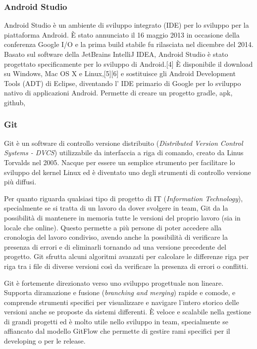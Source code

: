 \subsubsection{Android Studio}
Android Studio \autocite{WIKIPEDIA:ANDROIDSTUDIO} è un ambiente di sviluppo integrato (IDE) per lo sviluppo per la piattaforma Android. È stato annunciato il 16 maggio 2013 in occasione della conferenza Google I/O e la prima build stabile fu rilasciata nel dicembre del 2014.
Basato sul software della JetBrains IntelliJ IDEA, Android Studio è stato progettato specificamente per lo sviluppo di Android.[4] È disponibile il download su Windows, Mac OS X e Linux,[5][6] e sostituisce gli Android Development Tools (ADT) di Eclipse, diventando l' IDE primario di Google per lo sviluppo nativo di applicazioni Android.
Permette di creare un progetto gradle, apk, github, 


\subsubsection{Git}
Git è un software di controllo versione distribuito (\textit{Distributed Version Control Systems - DVCS}) utilizzabile da interfaccia a riga di comando, creato da Linus Torvalds nel 2005. \autocite{WIKIPEDIA:GIT}
Nacque per essere un semplice strumento per facilitare lo sviluppo del kernel Linux ed è diventato uno degli strumenti di controllo versione più diffusi.

Per quanto riguarda qualsiasi tipo di progetto di IT (\textit{Information Technology}), specialmente se si tratta di un lavoro da dover svolgere in team, Git da la possibilità di mantenere in memoria tutte le versioni del proprio lavoro (sia in locale che online).
Questo permette a più persone di poter accedere alla cronologia del lavoro condiviso, avendo anche la possibilità di verificare la presenza di errori e di eliminarli tornando ad una versione precedente del progetto.
Git sfrutta alcuni algoritmi avanzati per calcolare le differenze riga per riga tra i file di diverse versioni così da verificare la presenza di errori o conflitti.

Git è fortemente direzionato verso uno sviluppo progettuale non lineare. Supporta diramazione e fusione (\textit{branching and merging}) rapide e comode, e comprende strumenti specifici per visualizzare e navigare l'intero storico delle versioni anche se proposte da sistemi differenti.
È veloce e scalabile nella gestione di grandi progetti ed è molto utile nello sviluppo in team, specialmente se affiancato dal modello GitFlow che permette di gestire rami specifici per il developing o per le release.


